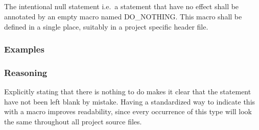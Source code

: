 \subsection*{\codingRule{}}

The intentional null statement i.e.\ a statement that have no effect shall be annotated by an empty macro named DO\_NOTHING. This macro shall be defined in a single place, suitably in a project specific header file.    %

\subsubsection*{Examples}

\noindent
\begin{minipage}[t]{\codelstwidth\linewidth}
    
\end{minipage}
\hfill
\begin{minipage}[t]{\codelstwidth\linewidth}
    
\end{minipage}

\subsubsection*{Reasoning}

Explicitly stating that there is nothing to do makes it clear that the statement have not been left blank by mistake. Having a standardized way to indicate this with a macro improves readability, since every occurrence of this type will look the same throughout all project source files.